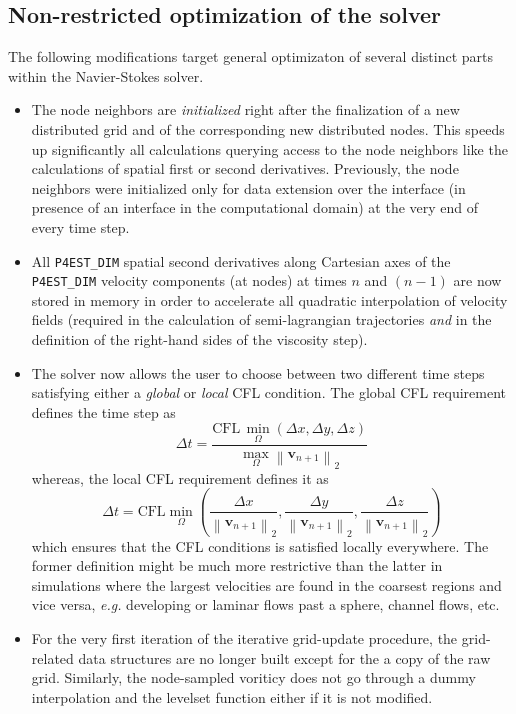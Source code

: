 \documentclass[11pt, a4paper]{article}
\theoremstyle{remark}
\begin{document}
\subsection{Non-restricted optimization of the solver}
\label{subsec:nonrestricted_optimization_of_the_solver}
The following modifications target general optimizaton of several distinct parts within the Navier-Stokes solver.
\begin{itemize}
 \item The node neighbors are \emph{initialized} right after the finalization of a new distributed grid and of the corresponding new distributed nodes. This speeds up significantly all calculations querying access to the node neighbors like the calculations of spatial first or second derivatives. Previously, the node neighbors were initialized only for data extension over the interface (in presence of an interface in the computational domain) at the very end of every time step.
 \item All \verb|P4EST_DIM| spatial second derivatives along Cartesian axes of the \verb|P4EST_DIM| velocity components (at nodes) at times $n$ and $\left( n-1 \right)$ are now stored in memory in order to accelerate all quadratic interpolation of velocity fields (required in the calculation of semi-lagrangian trajectories \emph{and} in the definition of the right-hand sides of the viscosity step).
 \item The solver now allows the user to choose between two different time steps satisfying either a \emph{global} or \emph{local} CFL condition. The global CFL requirement defines the time step as  
 $$\Delta t = \dfrac{\text{CFL}\, \min_{\Omega}\left( \Delta x, \Delta y, \Delta z \right)}{\max_{\Omega} \left\| \mathbf{v}_{n+1}\right\|_{2}}$$ 
 whereas, the local CFL requirement defines it as
 $$\Delta t = \text{CFL} \min_{\Omega}\left( \dfrac{\Delta x}{\left\| \mathbf{v}_{n+1}\right\|_{2}}, \dfrac{\Delta y}{\left\| \mathbf{v}_{n+1}\right\|_{2}}, \dfrac{\Delta z}{\left\| \mathbf{v}_{n+1}\right\|_{2}}\right)$$ 
 which ensures that the CFL conditions is satisfied locally everywhere. The former definition might be much more restrictive than the latter in simulations where the largest velocities are found in the coarsest regions and vice versa, \textit{e.g.} developing or laminar flows past a sphere, channel flows, etc. 
 \item For the very first iteration of the iterative grid-update procedure, the grid-related data structures are no longer built except for the a copy of the raw grid. Similarly, the node-sampled voriticy does not go through a dummy interpolation and the levelset function either if it is not modified.

\end{itemize}
\end{document}
